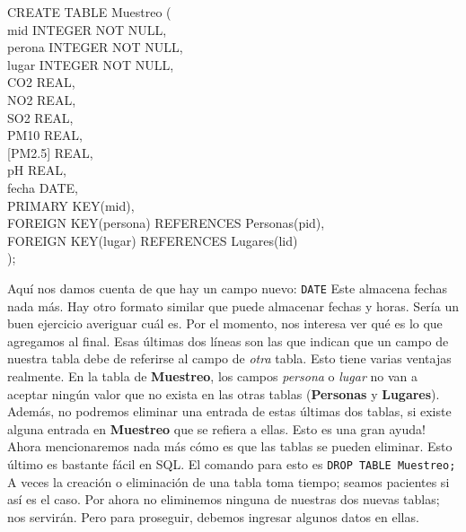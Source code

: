 \documentclass[10pt,letterpaper]{article}
\newcommand{\inlinecode}[1]{
\colorbox{light-gray}{\texttt{#1}}
}
\newenvironment{Code}
{
\begin{lrbox}{\selvestebox}%
\begin{minipage}{\dimexpr\columnwidth-2\fboxsep\relax}
\fontfamily{\ttdefault}\selectfont
}
{\end{minipage}\end{lrbox}%
\begin{center}
\colorbox{light-gray}{\usebox{\selvestebox}}
\end{center}
}
\begin{document}
\begin{Code}
CREATE TABLE Muestreo (\\
\hspace*{5mm}mid INTEGER NOT NULL,\\
\hspace*{5mm}perona INTEGER NOT NULL,\\
\hspace*{5mm}lugar INTEGER NOT NULL,\\
\hspace*{5mm}CO2 REAL,\\
\hspace*{5mm}NO2 REAL,\\
\hspace*{5mm}SO2 REAL,\\
\hspace*{5mm}PM10 REAL,\\
\hspace*{5mm}[PM2.5] REAL,\\
\hspace*{5mm}pH REAL,\\
\hspace*{5mm}fecha DATE,\\
\hspace*{5mm}PRIMARY KEY(mid),\\
\hspace*{5mm}FOREIGN KEY(persona) REFERENCES Personas(pid),\\
\hspace*{5mm}FOREIGN KEY(lugar) REFERENCES Lugares(lid)\\
);
\end{Code}

Aqu\'i nos damos cuenta de que hay un campo nuevo: \inlinecode{DATE} Este almacena fechas nada m\'as. Hay otro formato similar que puede almacenar fechas y horas. Ser\'ia un buen ejercicio averiguar cu\'al es. Por el momento, nos interesa ver qu\'e es lo que agregamos al final. Esas \'ultimas dos l\'ineas son las que indican que un campo de nuestra tabla debe de referirse al campo de \emph{otra} tabla. Esto tiene varias ventajas realmente. En la tabla de \textbf{Muestreo}, los campos \emph{persona} o \emph{lugar} no van a aceptar ning\'un valor que no exista en las otras tablas (\textbf{Personas} y \textbf{Lugares}). Adem\'as, no podremos eliminar una entrada de estas \'ultimas dos tablas, si existe alguna entrada en \textbf{Muestreo} que se refiera a ellas. Esto es una gran ayuda!\\

Ahora mencionaremos nada m\'as c\'omo es que las tablas se pueden eliminar. Esto \'ultimo es bastante f\'acil en SQL. El comando para esto es \inlinecode{DROP TABLE Muestreo;} A veces la creaci\'on o eliminaci\'on de una tabla toma tiempo; seamos pacientes si as\'i es el caso. Por ahora no eliminemos ninguna de nuestras dos nuevas tablas; nos servir\'an. Pero para proseguir, debemos ingresar algunos datos en ellas.
\end{document}
